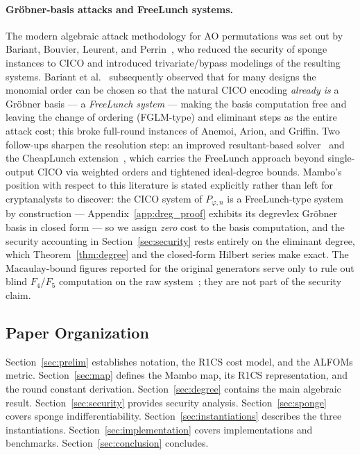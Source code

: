 \documentclass[11pt,a4paper]{article}
\theoremstyle{definition}
\begin{document}
\paragraph{Gr\"obner-basis attacks and FreeLunch systems.}
The modern algebraic attack methodology for AO permutations was set
out by Bariant, Bouvier, Leurent, and Perrin~\cite{Bariant_CICO}, who
reduced the security of sponge instances to CICO and introduced
trivariate/bypass modelings of the resulting systems. Bariant et
al.~\cite{FreeLunch} subsequently observed that for many designs the
monomial order can be chosen so that the natural CICO encoding
\emph{already is} a Gr\"obner basis --- a \emph{FreeLunch system} ---
making the basis computation free and leaving the change of ordering
(FGLM-type) and eliminant steps as the entire attack cost; this broke
full-round instances of Anemoi, Arion, and Griffin. Two follow-ups
sharpen the resolution step: an improved resultant-based
solver~\cite{Griffin_break} and the CheapLunch
extension~\cite{CheapLunch}, which carries the FreeLunch approach
beyond single-output CICO via weighted orders and tightened
ideal-degree bounds. Mambo's position with respect to this literature
is stated explicitly rather than left for cryptanalysts to discover:
the CICO system of $P_{\varphi,n}$ is a FreeLunch-type system by
construction --- Appendix~\ref{app:dreg_proof} exhibits its degrevlex
Gr\"obner basis in closed form --- so we assign \emph{zero} cost to
the basis computation, and the security accounting in
Section~\ref{sec:security} rests entirely on the eliminant degree,
which Theorem~\ref{thm:degree} and the closed-form Hilbert series
make exact. The Macaulay-bound figures reported for the original
generators serve only to rule out blind $F_4$/$F_5$ computation on
the raw system~\cite{Faugere_F4,Faugere_F5}; they are not part of the
security claim.


\subsection{Paper Organization}\label{sec:intro:organization}

Section~\ref{sec:prelim} establishes notation, the R1CS cost model, and the
ALFOMs metric. Section~\ref{sec:map} defines the Mambo map, its R1CS
representation, and the round constant derivation.
Section~\ref{sec:degree} contains the main algebraic result.
Section~\ref{sec:security} provides security analysis.
Section~\ref{sec:sponge} covers sponge indifferentiability.
Section~\ref{sec:instantiations} describes the three instantiations.
Section~\ref{sec:implementation} covers implementations and benchmarks.
Section~\ref{sec:conclusion} concludes.
\end{document}
